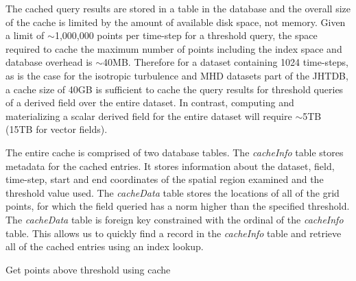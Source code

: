 \documentclass{sig-alternate}
\makeatletter
\let\OldStatex\Statex
\renewcommand{\Statex}[1][3]{%
  \setlength\@tempdima{\algorithmicindent}%
  \OldStatex\hskip\dimexpr#1\@tempdima\relax}
\makeatother
\begin{document}
The cached query results are stored in a table in the database and the overall size of the cache is limited by the amount of available disk space, not memory.
Given a limit of $\sim$1,000,000 points per time-step for a threshold query, the space required to cache the maximum number of points including the index
space and database overhead is $\sim$40MB. 
Therefore for a dataset containing 
1024 time-steps, as is the case for the isotropic turbulence and MHD datasets part of the JHTDB, a cache size of 40GB is sufficient to cache the query
results for threshold queries of a derived field over the entire dataset. In contrast, computing and materializing a scalar derived field for the entire dataset will
require $\sim$5TB (15TB for vector fields).

The entire cache is comprised of two database tables. The {\it cacheInfo} table stores metadata for the cached entries. It stores information about the
dataset, field, time-step, start and end coordinates of the spatial region examined and the threshold value used. The {\it cacheData} table stores the locations
of all of the grid points, for which the field queried has a norm higher than the specified threshold. The {\it cacheData} table is foreign key constrained with
the ordinal of the {\it cacheInfo} table. This allows us to quickly find a record in the {\it cacheInfo} table and retrieve all of the cached entries using an index
lookup.

\begin{algorithm}
\caption{Get points above threshold using cache}\label{alg:cache_lookup}
\end{algorithm}
\end{document}
